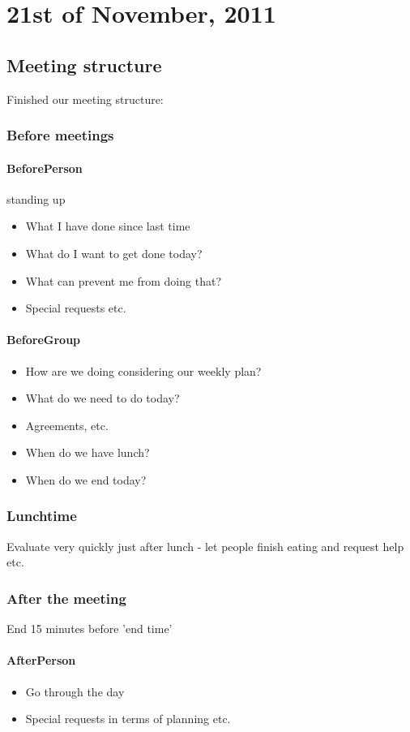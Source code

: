 \section{21st of November, 2011}
\subsection{Meeting structure}
Finished our meeting structure: \\
\subsubsection{Before meetings}
\paragraph{BeforePerson}
standing up
\begin{itemize}
\item What I have done since last time
\item What do I want to get done today?
\item What can prevent me from doing that?
\item Special requests etc.
\end{itemize}
\paragraph{BeforeGroup}
\begin{itemize}
\item How are we doing considering our weekly plan?
\item What do we need to do today?
\item Agreements, etc.
\item When do we have lunch?
\item When do we end today?
\end{itemize}

\subsubsection{Lunchtime}
Evaluate very quickly just after lunch - let people finish eating and request help etc.

\subsubsection{After the meeting} 
End 15 minutes before 'end time'
\paragraph{AfterPerson}
\begin{itemize}
\item Go through the day
\item Special requests in terms of planning etc.
\end{itemize}

